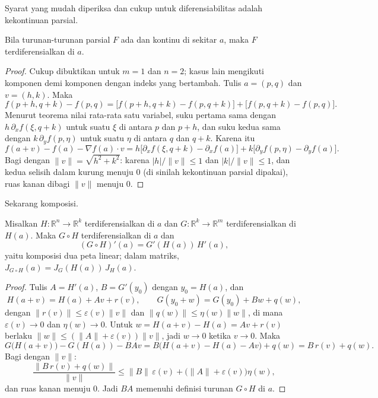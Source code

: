 Syarat yang mudah diperiksa dan cukup untuk diferensiabilitas adalah kekontinuan parsial.

\begin{teorema}
Bila turunan-turunan parsial $F$ ada dan kontinu di sekitar $a$, maka $F$ terdiferensialkan
di $a$.
\end{teorema}

\begin{proof}
Cukup dibuktikan untuk $m=1$ dan $n=2$; kasus lain mengikuti komponen demi komponen dengan
indeks yang bertambah. Tulis $a=(p,q)$ dan $v=(h,k)$. Maka
\[
  f(p+h,q+k)-f(p,q)
  =\bigl[f(p+h,q+k)-f(p,q+k)\bigr]+\bigl[f(p,q+k)-f(p,q)\bigr].
\]
Menurut teorema nilai rata-rata satu variabel, suku pertama sama dengan
$h\,\partial_{x}f(\xi,q+k)$ untuk suatu $\xi$ di antara $p$ dan $p+h$, dan suku kedua sama
dengan $k\,\partial_{y}f(p,\eta)$ untuk suatu $\eta$ di antara $q$ dan $q+k$. Karena itu
\[
  f(a+v)-f(a)-\nabla f(a)\cdot v
  =h\bigl[\partial_{x}f(\xi,q+k)-\partial_{x}f(a)\bigr]
  +k\bigl[\partial_{y}f(p,\eta)-\partial_{y}f(a)\bigr].
\]
Bagi dengan $\|v\|=\sqrt{h^{2}+k^{2}}$: karena $|h|/\|v\|\le1$ dan $|k|/\|v\|\le1$, dan
kedua selisih dalam kurung menuju $0$ (di sinilah kekontinuan parsial dipakai), ruas kanan
dibagi $\|v\|$ menuju $0$.
\end{proof}

Sekarang komposisi.

\begin{teorema}
Misalkan $H\colon\mathbb{R}^{n}\to\mathbb{R}^{k}$ terdiferensialkan di $a$ dan
$G\colon\mathbb{R}^{k}\to\mathbb{R}^{m}$ terdiferensialkan di $H(a)$. Maka $G\circ H$
terdiferensialkan di $a$ dan
\[
  (G\circ H)'(a)=G'(H(a))\,H'(a),
\]
yaitu komposisi dua peta linear; dalam matriks,
$J_{G\circ H}(a)=J_{G}(H(a))\,J_{H}(a)$.
\end{teorema}

\begin{proof}
Tulis $A=H'(a)$, $B=G'(y_{0})$ dengan $y_{0}=H(a)$, dan
\[
  H(a+v)=H(a)+Av+r(v),\qquad G(y_{0}+w)=G(y_{0})+Bw+q(w),
\]
dengan $\|r(v)\|\le\varepsilon(v)\|v\|$ dan $\|q(w)\|\le\eta(w)\|w\|$, di mana
$\varepsilon(v)\to0$ dan $\eta(w)\to0$. Untuk $w=H(a+v)-H(a)=Av+r(v)$ berlaku
$\|w\|\le(\|A\|+\varepsilon(v))\|v\|$, jadi $w\to0$ ketika $v\to0$. Maka
\[
  G\bigl(H(a+v)\bigr)-G(H(a))-BAv
  =B\bigl(H(a+v)-H(a)-Av\bigr)+q(w)
  =B\,r(v)+q(w).
\]
Bagi dengan $\|v\|$:
\[
  \frac{\|B\,r(v)+q(w)\|}{\|v\|}
  \le\|B\|\,\varepsilon(v)+\bigl(\|A\|+\varepsilon(v)\bigr)\eta(w),
\]
dan ruas kanan menuju $0$. Jadi $BA$ memenuhi definisi turunan $G\circ H$ di $a$.
\end{proof}

